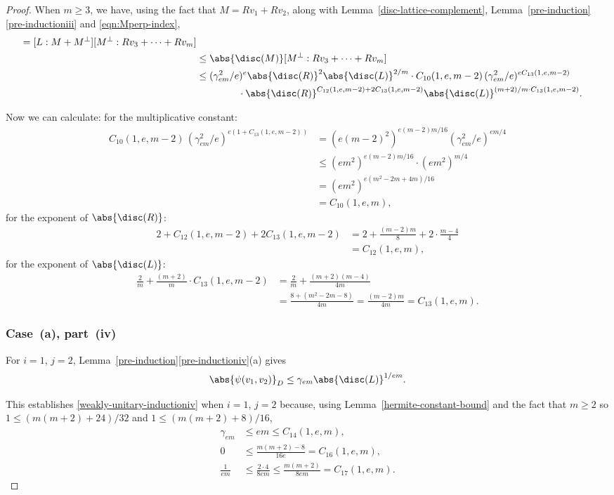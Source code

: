 \begin{proof}
When $m \geq 3$, we have, using the fact that $M = Rv_1 + Rv_2$, along with Lemma~\ref{disc-lattice-complement}, Lemma~\ref{pre-induction}\eqref{pre-inductioniii} and \eqref{eqn:Mperp-index},
\begin{align*}
[L : Rv_1 &+ \dotsb + Rv_m]
= [L : M + M^\perp] [M^\perp : Rv_3 + \dotsb + Rv_m]
\\& \leq \abs{\disc(M)} [M^\perp : Rv_3 + \dotsb + Rv_m]
\\& \leq (\gamma_{em}^2/e)^{e} \abs{\disc(R)}^2 \abs{\disc(L)}^{2/m}
\cdot C_{10}(1,e,m-2) \, (\gamma_{em}^2/e)^{eC_{13}(1,e,m-2)}
\\& \hspace*{1.5cm} \cdot \abs{\disc(R)}^{C_{12}(1,e,m-2) + 2C_{13}(1,e,m-2)} \abs{\disc(L)}^{(m+2)/m \cdot C_{13}(1,e,m-2)}.
\end{align*}

Now we can calculate:
for the multiplicative constant:
\begin{align*}
C_{10}(1,e,m-2) \, (\gamma_{em}^2/e)^{e(1+C_{13}(1,e,m-2))}
& = (e(m-2)^2)^{e(m-2)m/16} (\gamma_{em}^2/e)^{em/4}
\\& \leq (em^2)^{e(m-2)m/16} \cdot (em^2)^{m/4}
\\& = (em^2)^{e(m^2-2m + 4m)/16}
\\& = C_{10}(1,e,m),
\end{align*}
for the exponent of $\abs{\disc(R)}$:
\begin{align*}
2 + C_{12}(1,e,m-2) + 2C_{13}(1,e,m-2)
& = 2 + \frac{(m-2)m}{8} + 2 \cdot \frac{m-4}{4}
\\& = C_{12}(1,e,m),
\end{align*}
for the exponent of $\abs{\disc(L)}$:
\begin{align*}
\frac{2}{m} + \frac{(m+2)}{m} \cdot C_{13}(1,e,m-2)
& = \frac{2}{m} + \frac{(m+2)(m-4)}{4m}
\\& = \frac{8+(m^2-2m-8)}{4m} = \frac{(m-2)m}{4m} = C_{13}(1,e,m).
\end{align*}

\subsubsection*{Case~(a), part~(iv)}
For $i=1$, $j=2$, Lemma~\ref{pre-induction}\eqref{pre-inductioniv}(a) gives
\begin{equation} \label{eqn:case-a-iv-base}
\abs{\psi(v_1, v_2)}_D \leq \gamma_{em} \abs{\disc(L)}^{1/em}.
\end{equation}

This establishes \eqref{weakly-unitary-inductioniv} when $i=1$, $j=2$ because,
using Lemma~\ref{hermite-constant-bound} and the fact that $m \geq 2$ so $1 \leq (m(m+2)+24)/32$ and $1 \leq (m(m+2)+8)/16$,
\begin{align*}
\gamma_{em} & \leq em \leq C_{14}(1,e,m),
\\ 0 & \leq \frac{m(m+2)-8}{16e} = C_{16}(1,e,m),
\\ \frac{1}{em} & \leq \frac{2 \cdot 4}{8em} \leq \frac{m(m+2)}{8em} = C_{17}(1,e,m).
\end{align*}


\end{proof}
